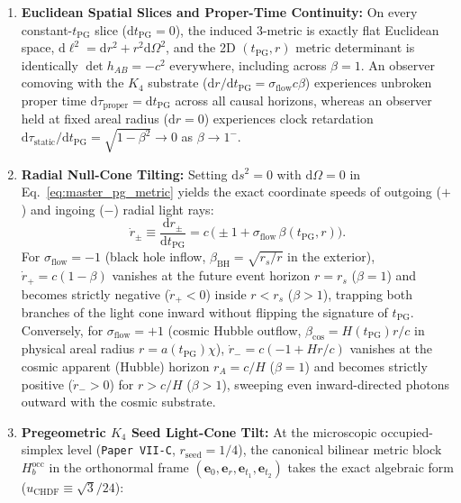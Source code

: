 \documentclass[11pt,a4paper]{article}
\theoremstyle{remark}
\begin{document}
\begin{enumerate}
  \item \textbf{Euclidean Spatial Slices and Proper-Time Continuity:} On every constant-$t_{\mathrm{PG}}$ slice ($\mathrm{d}t_{\mathrm{PG}} = 0$), the induced 3-metric is exactly flat Euclidean space, $\mathrm{d}\ell^2 = \mathrm{d}r^2 + r^2\mathrm{d}\Omega^2$, and the 2D $(t_{\mathrm{PG}}, r)$ metric determinant is identically $\det h_{AB} = -c^2$ everywhere, including across $\beta = 1$. An observer comoving with the $K_4$ substrate ($\mathrm{d}r/\mathrm{d}t_{\mathrm{PG}} = \sigma_{\mathrm{flow}} c\beta$) experiences unbroken proper time $\mathrm{d}\tau_{\mathrm{proper}} = \mathrm{d}t_{\mathrm{PG}}$ across all causal horizons, whereas an observer held at fixed areal radius ($\mathrm{d}r = 0$) experiences clock retardation $\mathrm{d}\tau_{\mathrm{static}}/\mathrm{d}t_{\mathrm{PG}} = \sqrt{1 - \beta^2} \to 0$ as $\beta \to 1^-$.
  \item \textbf{Radial Null-Cone Tilting:} Setting $\mathrm{d}s^2 = 0$ with $\mathrm{d}\Omega = 0$ in Eq.~\eqref{eq:master_pg_metric} yields the exact coordinate speeds of outgoing ($+$) and ingoing ($-$) radial light rays:
  \begin{equation}
    \dot{r}_\pm \equiv \frac{\mathrm{d}r_\pm}{\mathrm{d}t_{\mathrm{PG}}} = c\,\bigl(\pm 1 + \sigma_{\mathrm{flow}}\,\beta(t_{\mathrm{PG}}, r)\bigr).
    \label{eq:null_speeds}
  \end{equation}
  For $\sigma_{\mathrm{flow}} = -1$ (black hole inflow, $\beta_{\mathrm{BH}} = \sqrt{r_s/r}$ in the exterior), $\dot{r}_+ = c(1 - \beta)$ vanishes at the future event horizon $r = r_s$ ($\beta = 1$) and becomes strictly negative ($\dot{r}_+ < 0$) inside $r < r_s$ ($\beta > 1$), trapping both branches of the light cone inward without flipping the signature of $t_{\mathrm{PG}}$. Conversely, for $\sigma_{\mathrm{flow}} = +1$ (cosmic Hubble outflow, $\beta_{\mathrm{cos}} = H(t_{\mathrm{PG}})r/c$ in physical areal radius $r = a(t_{\mathrm{PG}})\chi$), $\dot{r}_- = c(-1 + Hr/c)$ vanishes at the cosmic apparent (Hubble) horizon $r_A = c/H$ ($\beta = 1$) and becomes strictly positive ($\dot{r}_- > 0$) for $r > c/H$ ($\beta > 1$), sweeping even inward-directed photons outward with the cosmic substrate.
  \item \textbf{Pregeometric $K_4$ Seed Light-Cone Tilt:} At the microscopic occupied-simplex level (\texttt{Paper VII-C}, $r_{\mathrm{seed}} = 1/4$), the canonical bilinear metric block $H_b^{\mathrm{occ}}$ in the orthonormal frame $(\mathbf{e}_0, \mathbf{e}_r, \mathbf{e}_{t_1}, \mathbf{e}_{t_2})$ takes the exact algebraic form ($u_{\mathrm{CHDF}} \equiv \sqrt{3}/24$):

\end{enumerate}
\end{document}

